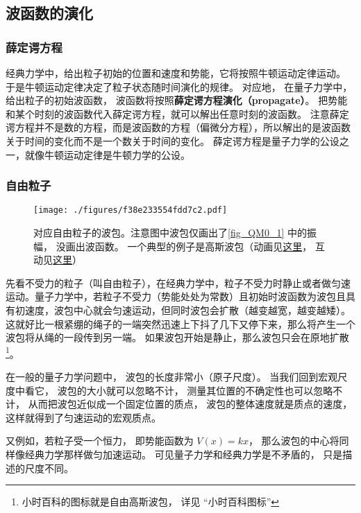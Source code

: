 \subsection{波函数的演化}
\subsubsection{薛定谔方程}
经典力学中，给出粒子初始的位置和速度和势能，它将按照牛顿运动定律运动。 于是牛顿运动定律决定了粒子状态随时间演化的规律。 对应地， 在量子力学中， 给出粒子的初始波函数， 波函数将按照\textbf{薛定谔方程}\textbf{演化（propagate）}。 把势能和某个时刻的波函数代入薛定谔方程，就可以解出任意时刻的波函数。 注意薛定谔方程并不是数的方程，而是波函数的方程（偏微分方程），所以解出的是波函数关于时间的变化而不是一个数关于时间的变化。 薛定谔方程是量子力学的公设之一，就像牛顿运动定律是牛顿力学的公设。

\subsubsection{自由粒子}

\begin{figure}[ht]
\centering
\texttt{[image: ./figures/f38e233554fdd7c2.pdf]}
\caption{对应自由粒子的波包。注意图中波包仅画出了\autoref{fig_QM0_1} 中的振幅， 没画出波函数。 一个典型的例子是高斯波包（动画见\href{https://wuli.wiki/apps/free_gauss.html}{这里}， 互动见\href{https://wuli.wiki/apps/gausWP.html}{这里}）} \label{fig_QM0_2}
\end{figure}

先看不受力的粒子（叫自由粒子），在经典力学中，粒子不受力时静止或者做匀速运动。量子力学中，若粒子不受力（势能处处为常数）且初始时波函数为波包且具有初速度，波包中心就会匀速运动，但同时波包会扩散（越变越宽，越变越矮）。这就好比一根紧绷的绳子的一端突然迅速上下抖了几下又停下来，那么将产生一个波包将从绳的一段传到另一端。 如果波包开始是静止，那么波包只会在原地扩散\footnote{小时百科的图标就是自由高斯波包， 详见 “小时百科图标”}。

在一般的量子力学问题中， 波包的长度非常小（原子尺度）。 当我们回到宏观尺度中看它， 波包的大小就可以忽略不计， 测量其位置的不确定性也可以忽略不计， 从而把波包近似成一个固定位置的质点， 波包的整体速度就是质点的速度， 这样就得到了匀速运动的宏观质点。

又例如，若粒子受一个恒力， 即势能函数为 $V(x) = kx$， 那么波包的中心将同样像经典力学那样做匀加速运动。 可见量子力学和经典力学是不矛盾的， 只是描述的尺度不同。

